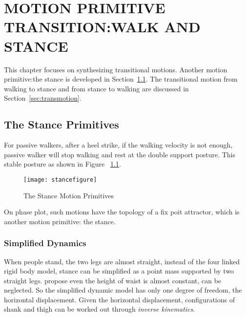 
\chapter{MOTION PRIMITIVE TRANSITION:WALK AND STANCE}
\label{chap:stance}
    \graphicspath{{WalkStance/WalkStanceFigs/EPS/}{WalkStance/WalkStanceFigs/}}

This chapter focuses on synthesizing transitional motions.
Another motion primitive:the stance is developed in Section~\ref{sec:stanceprimitive}.
The transitional motion from walking to stance and from stance to walking are discussed in Section~\ref{sec:transmotion}.




    
    




\section{The Stance Primitives}
\label{sec:stanceprimitive}
For passive walkers, after a  heel strike, if the walking velocity is not enough, passive walker will stop walking and rest at the double support posture.
This stable posture as shown in Figure ~\ref{fig:bipedalstance}.
\begin{figure}[!htbp]
  \begin{center}
     \texttt{[image: stancefigure]}
    \caption{The Stance Motion Primitives}
    \label{fig:bipedalstance}
\end{center}
\end{figure}

On phase plot, such motions have the topology of a fix poit attractor, which is  another motion primitive: the stance. 



\subsection{Simplified Dynamics}
When people stand, the two legs are almost straight,
instead of the four linked rigid body model, stance can be simplified as a point mass supported by two straight legs. 
\citet{stephens2009modeling} propose even the height of waist is almost constant, can be neglected.
So the simplified dynamic model has only one degree of freedom, the horizontal displacement.
Given the horizontal displacement, configurations of shank and thigh can be worked out through \emph{inverse kinematics}.
 




